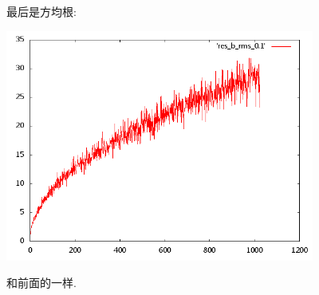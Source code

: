 \documentclass{ctexart}
\begin{document}
最后是方均根:
\begin{center}
\includegraphics[width=4in]{plot_b_rms_0.1.png}
\end{center}
和前面的一样.
\end{document}
